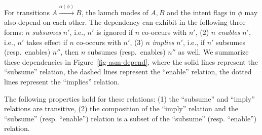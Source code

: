 For transitions $A \xrightarrow{\alpha(\phi)} B$, the launch modes of $A, B$ and the intent flags in $\phi$ may also depend on each other. The dependency can exhibit in the following three forms: 
$n$ \emph{subsumes} $n'$, i.e., $n'$ is ignored if $n$ co-occurs with $n'$, 
(2) $n$ \emph{enables} $n'$, i.e., $n'$ takes effect if $n$ co-occurs with $n'$,
(3) $n$ \emph{implies} $n'$, i.e., if $n'$ subsumes (resp.\ enables) $n''$, then $n$ subsumes (resp.\ enables) $n''$ as well.
%
We summarize these dependencies in Figure~\ref{fig-asm-depend}, where the solid lines represent the ``subsume'' relation, the dashed lines represent  the ``enable'' relation, the dotted lines represent the ``implies'' relation. 

The following properties hold for these relations: (1) the ``subsume'' and ``imply'' relations are transitive, (2) the composition of the ``imply''  relation and the ``subsume'' (resp. ``enable'') relation is a subset of the ``subsume'' (resp. ``enable'') relation. 


